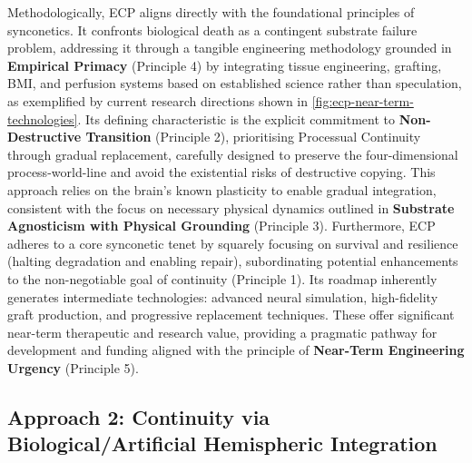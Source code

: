 \documentclass[10pt]{article}
\begin{document}
\begin{sloppypar}
  Methodologically, ECP aligns directly with the foundational principles of synconetics. It confronts biological death as a contingent substrate failure problem, addressing it through a tangible engineering methodology grounded in \textbf{Empirical Primacy} (Principle 4) by integrating tissue engineering, grafting, BMI, and perfusion systems based on established science rather than speculation, as exemplified by current research directions shown in \autoref{fig:ecp-near-term-technologies}. Its defining characteristic is the explicit commitment to \textbf{Non-Destructive Transition} (Principle 2), prioritising Processual Continuity through gradual replacement, carefully designed to preserve the four-dimensional process-world-line and avoid the existential risks of destructive copying. This approach relies on the brain’s known plasticity to enable gradual integration, consistent with the focus on necessary physical dynamics outlined in \textbf{Substrate Agnosticism with Physical Grounding} (Principle 3). Furthermore, ECP adheres to a core synconetic tenet by squarely focusing on survival and resilience (halting degradation and enabling repair), subordinating potential enhancements to the non-negotiable goal of continuity (Principle 1). Its roadmap inherently generates intermediate technologies: advanced neural simulation, high-fidelity graft production, and progressive replacement techniques. These offer significant near-term therapeutic and research value, providing a pragmatic pathway for development and funding aligned with the principle of \textbf{Near-Term Engineering Urgency} (Principle 5).

  \newpage

  \subsection[Approach 2: Continuity via Hemispheric Integration]{Approach 2: Continuity via Biological/Artificial Hemispheric Integration}
  \label{sec:chi}


\end{sloppypar}
\end{document}
